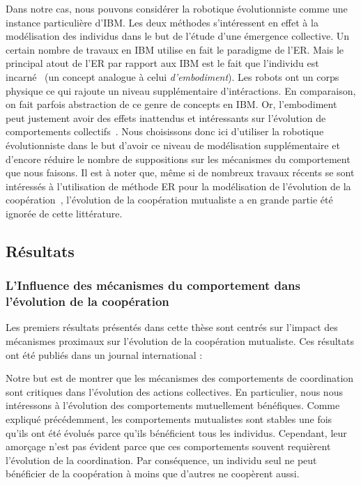 		Dans notre cas, nous pouvons considérer la robotique évolutionniste comme une instance particulière d'IBM. Les deux méthodes s'intéressent en effet à la modélisation des individus dans le but de l'étude d'une émergence collective. Un certain nombre de travaux en IBM utilise en fait le paradigme de l'ER. Mais le principal atout de l'ER par rapport aux IBM est le fait que l'individu est incarné~\parencite{Mitri2012} (un concept analogue à celui \emph{d'embodiment}). Les robots ont un corps physique ce qui rajoute un niveau supplémentaire d'intéractions. En comparaison, on fait parfois abstraction de ce genre de concepts en IBM. Or, l'embodiment peut justement avoir des effets inattendus et intéressants sur l'évolution de comportements collectifs~\parencite{Mitri2009}. Nous choisissons donc ici d'utiliser la robotique évolutionniste dans le but d'avoir ce niveau de modélisation supplémentaire et d'encore réduire le nombre de suppositions sur les mécanismes du comportement que nous faisons. Il est à noter que, même si de nombreux travaux récents se sont intéressés à l'utilisation de méthode ER pour la modélisation de l'évolution de la coopération~\parencite{Waibel2009, Waibel2011, Montanier2011, Ferrante2015}, l'évolution de la coopération mutualiste a en grande partie été ignorée de cette littérature.


	\subsection{Résultats}

		\subsubsection{L'Influence des mécanismes du comportement dans l'évolution de la coopération}

			Les premiers résultats présentés dans cette thèse sont centrés sur l'impact des mécanismes proximaux sur l'évolution de la coopération mutualiste. Ces résultats ont été publiés dans un journal international :

			\begin{quote}
			\end{quote}

			Notre but est de montrer que les mécanismes des comportements de coordination sont critiques dans l'évolution des actions collectives. En particulier, nous nous intéressons à l'évolution des comportements mutuellement bénéfiques. Comme expliqué précédemment, les comportements mutualistes sont stables une fois qu'ils ont été évolués parce qu'ils bénéficient tous les individus. Cependant, leur amorçage n'est pas évident parce que ces comportements souvent requièrent l'évolution de la coordination. Par conséquence, un individu seul ne peut bénéficier de la coopération à moins que d'autres ne coopèrent aussi.

